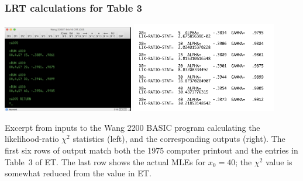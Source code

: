 \begin{frame}
    \frametitle{LRT calculations for Table 3}
    \begin{center}
        \includegraphics[width=2.25in]{Photos/mle-bas-input-1.pdf}        
        \includegraphics[width=2.5in]{Photos/mle-bas-output-1.pdf}
    \end{center} 
	{\small Excerpt from inputs to the Wang 2200 BASIC program calculating the likelihood-ratio $\chi^2$ statistics (left), and the corresponding outputs (right).  The first six rows of output match both the 1975 computer printout and the entries in Table~3 of ET.  The last row shows the actual MLEs for $x_0=40$; the $\chi^2$ value is somewhat reduced from the value in ET.} 
	 
\end{frame}

